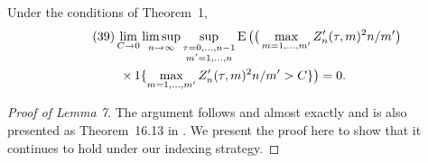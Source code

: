 \documentclass[11pt]{article}
\begin{document}
{%
\newcommand{\uiterm}{\max_{m \in 1,\dots,m'} \Big(
  \sum_{t \in I_n(\tau, m)} (X_{nt} - \mu_{nt})\Big)^2 \Big/
  \sum_{t\in I_n(\tau, m')} c_{nt}^2}
\newcommand{\uitermb}{\sum_{\tau=0}^{n-1} \tfrac{1}{n m'} \max_{m \in 1,\dots,m'} \Big(
  \sum_{t \in I_n(\tau, m)} (X_{nt} - \bar X_n)\Big)^2}
\begin{customlem}{7}
  Under the conditions of Theorem~1,
  \begin{multline}\label{eq:5}\tag{39}
    \lim_{C \to 0} \limsup_{n \to \infty} \sup_{\substack{\tau = 0,\dots,n-1 \\  m' = 1,\dots,n}}
    \operatorname{E}\big(\big(\max_{m=1,\dots,m'} Z'_n(\tau, m)^2 n / m'\big) \\
    \times\operatorname{1}\{\max_{m=1,\dots,m'} Z'_n(\tau, m)^2 n / m' > C\}\big) = 0.
  \end{multline}
\end{customlem}

\begin{proof}[Proof of Lemma 7]
  \newcommand{\w}{w_{n}(\tau, m')}
  \newcommand{\sums}[1]{\Big(\sum_{t \in I_{n}(\tau, m)} #1_{nt} \Big)^2}
  \renewcommand{\uiterm}{\max_{m \in 1,\dots,m'} \Big(
    \sum_{t \in I_n(\tau, m)} X_{nt}\Big)^2 \Big/
    \Big(\sum_{t\in I_n(\tau, m')} c_{nt} \Big)^2}

  The argument follows \citet[Lemma 6.5]{Mcl:75b} and
  \citet[Lemma 3.5]{Mcl:77} almost exactly and is also presented as
  Theorem~16.13 in \citet{Dav:94}. We present the proof here to show
  that it continues to hold under our indexing strategy.


\end{proof}}
\end{document}
